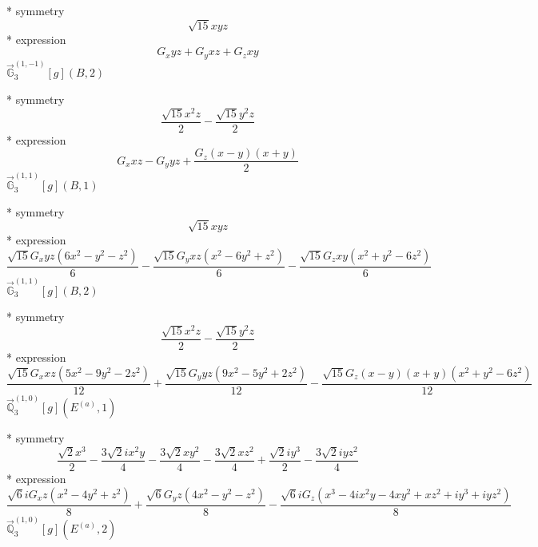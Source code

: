 \documentclass[fleqn,8pt]{jsarticle}
\begin{document}
\noindent\quad ** symmetry
\begin{dmath*}
\sqrt{15} x y z
\end{dmath*}
\noindent\quad ** expression
\begin{dmath*}
G_{x} y z + G_{y} x z + G_{z} x y
\end{dmath*}
\noindent\quad $\vec{\mathbb{G}}_{3}^{(1,-1)}[g](B,2)$

\noindent\quad ** symmetry
\begin{dmath*}
\frac{\sqrt{15} x^{2} z}{2} - \frac{\sqrt{15} y^{2} z}{2}
\end{dmath*}
\noindent\quad ** expression
\begin{dmath*}
G_{x} x z - G_{y} y z + \frac{G_{z} \left(x - y\right) \left(x + y\right)}{2}
\end{dmath*}
\noindent\quad $\vec{\mathbb{G}}_{3}^{(1,1)}[g](B,1)$

\noindent\quad ** symmetry
\begin{dmath*}
\sqrt{15} x y z
\end{dmath*}
\noindent\quad ** expression
\begin{dmath*}
\frac{\sqrt{15} G_{x} y z \left(6 x^{2} - y^{2} - z^{2}\right)}{6} - \frac{\sqrt{15} G_{y} x z \left(x^{2} - 6 y^{2} + z^{2}\right)}{6} - \frac{\sqrt{15} G_{z} x y \left(x^{2} + y^{2} - 6 z^{2}\right)}{6}
\end{dmath*}
\noindent\quad $\vec{\mathbb{G}}_{3}^{(1,1)}[g](B,2)$

\noindent\quad ** symmetry
\begin{dmath*}
\frac{\sqrt{15} x^{2} z}{2} - \frac{\sqrt{15} y^{2} z}{2}
\end{dmath*}
\noindent\quad ** expression
\begin{dmath*}
\frac{\sqrt{15} G_{x} x z \left(5 x^{2} - 9 y^{2} - 2 z^{2}\right)}{12} + \frac{\sqrt{15} G_{y} y z \left(9 x^{2} - 5 y^{2} + 2 z^{2}\right)}{12} - \frac{\sqrt{15} G_{z} \left(x - y\right) \left(x + y\right) \left(x^{2} + y^{2} - 6 z^{2}\right)}{12}
\end{dmath*}
\noindent\quad $\vec{\mathbb{Q}}_{3}^{(1,0)}[g](E^{(a)},1)$

\noindent\quad ** symmetry
\begin{dmath*}
\frac{\sqrt{2} x^{3}}{2} - \frac{3 \sqrt{2} i x^{2} y}{4} - \frac{3 \sqrt{2} x y^{2}}{4} - \frac{3 \sqrt{2} x z^{2}}{4} + \frac{\sqrt{2} i y^{3}}{2} - \frac{3 \sqrt{2} i y z^{2}}{4}
\end{dmath*}
\noindent\quad ** expression
\begin{dmath*}
\frac{\sqrt{6} i G_{x} z \left(x^{2} - 4 y^{2} + z^{2}\right)}{8} + \frac{\sqrt{6} G_{y} z \left(4 x^{2} - y^{2} - z^{2}\right)}{8} - \frac{\sqrt{6} i G_{z} \left(x^{3} - 4 i x^{2} y - 4 x y^{2} + x z^{2} + i y^{3} + i y z^{2}\right)}{8}
\end{dmath*}
\noindent\quad $\vec{\mathbb{Q}}_{3}^{(1,0)}[g](E^{(a)},2)$
\end{document}
